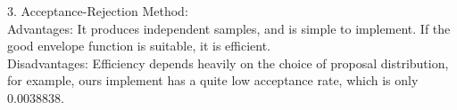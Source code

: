 \begin{homeworkProblem}
3. Acceptance-Rejection Method: \\
Advantages: It produces independent samples, and is simple to implement. If the good envelope function is suitable, it is efficient. \\
Disadvantages: Efficiency depends heavily on the choice of proposal distribution, for example, ours implement has a quite low acceptance rate, which is only 0.0038838.

\end{homeworkProblem}

\newpage